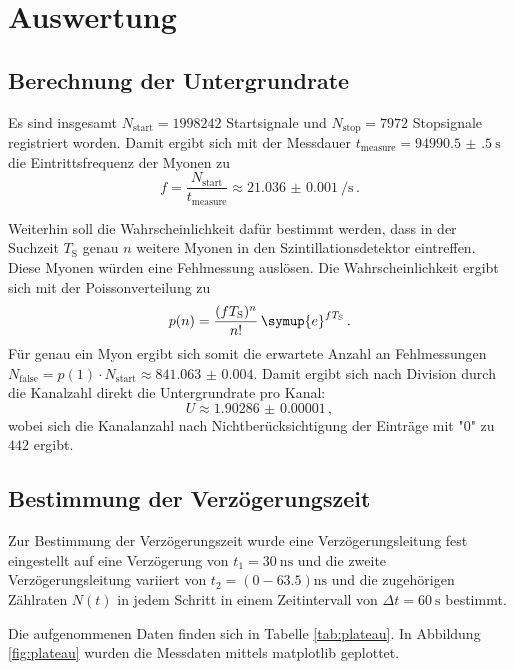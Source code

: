 \section{Auswertung}
\label{sec:Auswertung}

\subsection{Berechnung der Untergrundrate}
\label{sec:unter}
Es sind insgesamt $N_\text{start}=1998242$ Startsignale und
$N_\text{stop}=7972$ Stopsignale registriert worden.
Damit ergibt sich mit der Messdauer $t_\text{measure}=\SI{94990.5(5)}{\second}$
die Eintrittsfrequenz der Myonen zu
\begin{equation*}
	f = \frac{N_\text{start}}{t_\text{measure}} \approx \SI{21.036(1)}{\per\second} \, \text{.}
\end{equation*}


Weiterhin soll die Wahrscheinlichkeit dafür bestimmt werden, dass in der
Suchzeit $T_\text{S}$ genau $n$ weitere Myonen in den Szintillationsdetektor
eintreffen. Diese Myonen würden eine Fehlmessung auslösen. Die Wahrscheinlichkeit ergibt sich mit der Poissonverteilung zu
\begin{equation*}
	p(n)=\frac{(f T_\text{S})^n}{n!} \, \symup{e}^{f T_\text{S}} \, \text{.}
\end{equation*}
Für genau ein Myon ergibt sich somit die erwartete Anzahl an Fehlmessungen
$N_\text{false}=p(1) \cdot N_\text{start} \approx \num{841.063(4)}$. Damit ergibt sich
nach Division durch die Kanalzahl direkt die Untergrundrate pro Kanal:
\begin{equation*}
	U \approx \num{1.90286(1)} \, \mathrm{,}
\end{equation*}
wobei sich die Kanalanzahl nach Nichtberücksichtigung der Einträge mit "$0$" zu $442$ ergibt.
\subsection{Bestimmung der Verzögerungszeit}
Zur Bestimmung der Verzögerungszeit wurde eine Verzögerungsleitung fest eingestellt auf eine Verzögerung von $t_1=\SI{30}{\nano\second}$ und die zweite Verzögerungsleitung variiert von $t_2=(\num{0}-\num{63.5})\si{\nano\second}$ und die zugehörigen Zählraten $N(t)$ in jedem Schritt in einem Zeitintervall von $\Delta t=\SI{60}{\second}$ bestimmt.

Die aufgenommenen Daten finden sich in Tabelle \ref{tab:plateau}. In Abbildung \ref{fig:plateau} wurden die Messdaten mittels matplotlib \cite{matplotlib} geplottet.

